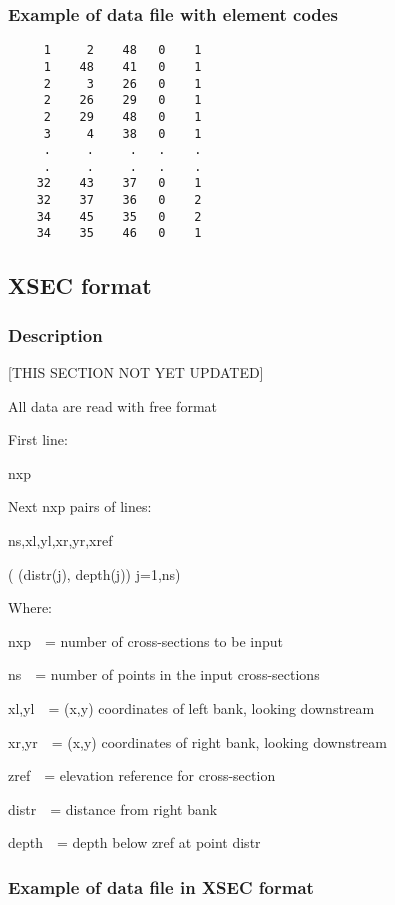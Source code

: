 \documentclass{article}
\begin{document}
\subsubsection{Example of data file with element codes}
\begin{small}
\begin{lstlisting}
     1     2    48   0    1
     1    48    41   0    1
     2     3    26   0    1
     2    26    29   0    1
     2    29    48   0    1
     3     4    38   0    1
     .     .     .   .    .
     .     .     .   .    .
    32    43    37   0    1
    32    37    36   0    2
    34    45    35   0    2
    34    35    46   0    1
\end{lstlisting}
\end{small}

\subsection[XSEC format]{XSEC format}
\subsubsection[Description]{Description}
[THIS SECTION NOT YET UPDATED]
\bigskip

All data are read with free format

First line:

nxp

Next nxp pairs of lines:

ns,xl,yl,xr,yr,xref

( (distr(j), depth(j)) j=1,ns)


\bigskip


\bigskip

Where:

nxp\ \ = number of cross-sections to be input

ns\ \ = number of points in the input cross-sections

xl,yl\ \ = (x,y) coordinates of left bank, looking downstream

xr,yr\ \ = (x,y) coordinates of right bank, looking downstream

zref\ \ = elevation reference for cross-section

distr\ \ = distance from right bank

depth\ \ = depth below zref at point distr


\bigskip

\subsubsection[Example of data file in XSEC format]{Example of data file in XSEC format}
\end{document}
